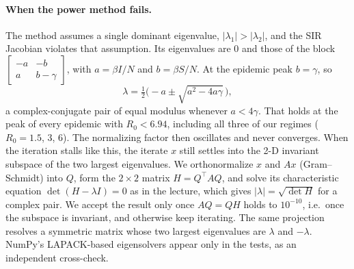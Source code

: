\paragraph{When the power method fails.} The method assumes a single dominant eigenvalue,
$|\lambda_1| > |\lambda_2|$, and the SIR Jacobian violates that assumption. Its eigenvalues are 0 and those of the
block $\left[\begin{smallmatrix} -a & -b \\ a & b-\gamma \end{smallmatrix}\right]$, with
$a = \beta I/N$ and $b = \beta S/N$. At the epidemic peak $b = \gamma$, so
\begin{equation}
  \lambda = \tfrac{1}{2}\big(-a \pm \sqrt{a^2 - 4a\gamma}\,\big), \label{eq:jaceig}
\end{equation}
a complex-conjugate pair of equal modulus whenever $a < 4\gamma$. That holds at the peak of every
epidemic with $R_0 < 6.94$, including all three of our regimes ($R_0 = 1.5$, 3, 6). The normalizing
factor then oscillates and never converges. When the iteration stalls like this, the iterate $x$
still settles into the 2-D invariant subspace of the two largest eigenvalues. We orthonormalize
$x$ and $Ax$ (Gram--Schmidt) into $Q$, form the $2\times2$ matrix $H = Q^\top A Q$, and solve its
characteristic equation $\det(H - \lambda I) = 0$ as in the lecture, which gives
$|\lambda| = \sqrt{\det H}$ for a complex pair. We accept the result only once $AQ = QH$ holds to
$10^{-10}$, i.e.\ once the subspace is invariant, and otherwise keep iterating. The same projection
resolves a symmetric matrix whose two largest eigenvalues are $\lambda$ and $-\lambda$. NumPy's
LAPACK-based eigensolvers appear only in the tests, as an independent cross-check.
